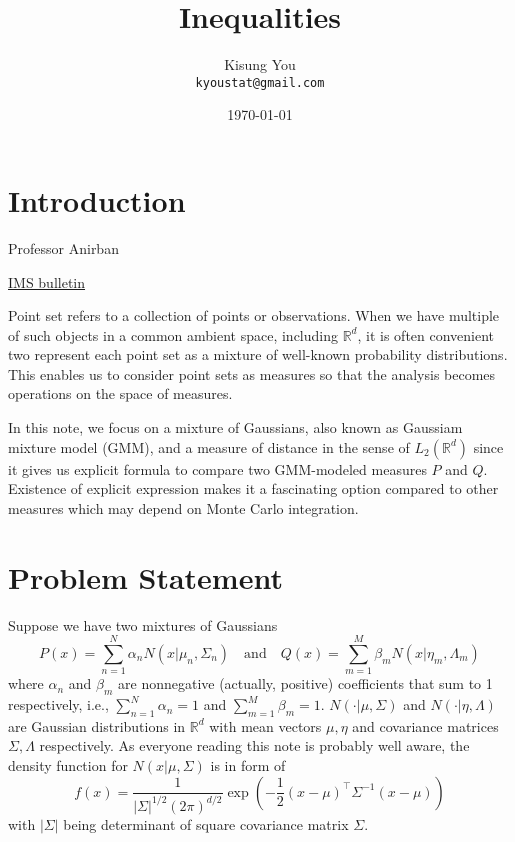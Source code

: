 \documentclass[fontsize=12pt]{article}
\title{Inequalities}
\author{
	Kisung You\\
	\texttt{kyoustat@gmail.com}
}
\date{\today}
\begin{document}
\maketitle

\section{Introduction}

Professor Anirban 

\href{https://imstat.org/2013/05/16/anirbans-angle-top-inequalities-for-a-phd-student/}{IMS bulletin}

Point set refers to a collection of points or observations. When we have multiple of such objects in a common ambient space, including $\mathbb{R}^d$, it is often convenient two represent each point set as a mixture of well-known probability distributions. This enables us to consider point sets as measures so that the analysis becomes operations on the space of measures. 

In this note, we focus on a mixture of Gaussians, also known as Gaussiam mixture model (GMM), and a measure of distance in the sense of $L_2 (\mathbb{R}^d)$ since it gives us explicit formula to compare two GMM-modeled measures $P$ and $Q$. Existence of explicit expression makes it a fascinating option compared to other measures which may depend on Monte Carlo integration. 


\section{Problem Statement}
Suppose we have two mixtures of Gaussians
\begin{equation*}
P(x)= \sum_{n=1}^N \alpha_n N(x|\mu_n, \Sigma_n) \quad \text{and} \quad
Q(x) = \sum_{m=1}^M \beta_m N(x|\eta_m, \Lambda_m)
\end{equation*}
where $\alpha_n$ and $\beta_m$ are nonnegative (actually, positive) coefficients that sum to 1 respectively, i.e., $\sum_{n=1}^N \alpha_n = 1$ and $\sum_{m=1}^M \beta_m = 1$. $N(\cdot | \mu, \Sigma)$ and $N(\cdot|\eta, \Lambda)$ are Gaussian distributions in $\mathbb{R}^d$ with mean vectors $\mu, \eta$ and covariance matrices $\Sigma, \Lambda$ respectively. As everyone reading this note is probably well aware, the density function for $N(x|\mu,\Sigma)$ is in form of 
\begin{equation*}
f (x) = \frac{1}{| \Sigma |^{1/2} (2\pi)^{d/2}} 
\exp \left(
-\frac{1}{2} (x-\mu)^\top \Sigma^{-1} (x-\mu)
\right)
\end{equation*}
with $|\Sigma|$ being determinant of square covariance matrix $\Sigma$.
\end{document}
